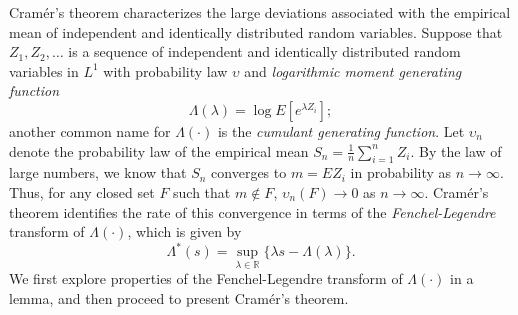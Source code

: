 Cram\'{e}r's theorem characterizes the large deviations associated with the empirical mean of independent and identically distributed random variables.
Suppose that $Z_1, Z_2, \ldots$ is a sequence of independent and identically distributed random variables in $L^1$ with probability law $\upsilon$ and \emph{logarithmic moment generating function}
\begin{equation*}
\Lambda(\lambda) = \log E \left[ e^{\lambda Z_i} \right] ;
\end{equation*}
another common name for $\Lambda (\cdot)$ is the \emph{cumulant generating function}.
Let $\upsilon_n$ denote the probability law of the empirical mean $S_n = \frac{1}{n} \sum_{i=1}^n Z_i$.
By the law of large numbers, we know that $S_n$ converges to $m = E Z_i$ in probability as $n \rightarrow \infty$.
Thus, for any closed set $F$ such that $m \notin F$, $\upsilon_n(F) \rightarrow 0$ as $n \rightarrow \infty$.
Cram\'{e}r's theorem identifies the rate of this convergence in terms of the \emph{Fenchel-Legendre} transform of $\Lambda(\cdot)$, which is given by
\begin{equation*}
\Lambda^*(s) = \sup_{\lambda \in \mathbb{R}} \{ \lambda s - \Lambda(\lambda) \} .
\end{equation*}
We first explore properties of the Fenchel-Legendre transform of $\Lambda (\cdot)$ in a lemma, and then proceed to present Cram\'er's theorem.


